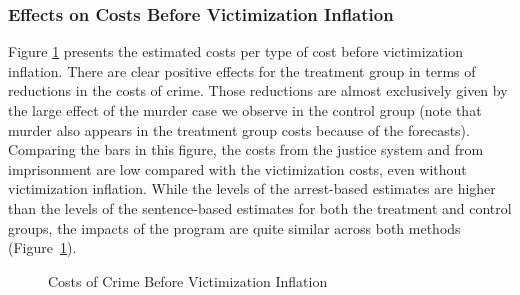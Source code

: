 \subsubsection{Effects on Costs Before Victimization Inflation}  Figure \ref{tab:diff-costs} presents the estimated costs per type of cost before victimization inflation.
\noindent There are clear positive effects for the treatment group in terms of reductions in the costs of crime. Those reductions are almost exclusively given by the large effect of the murder case we observe in the control group (note that murder also appears in the treatment group costs because of the forecasts). Comparing the bars in this figure, the costs from the justice system and from imprisonment are low compared with the victimization costs, even without victimization inflation. While the levels of the arrest-based estimates are higher than the levels of the sentence-based estimates for both the treatment and control groups, the impacts of the program are quite similar across both methods (Figure~\ref{tab:diff-costs}). 

\begin{figure} [H]
\caption{Costs of Crime Before Victimization Inflation}
\centering  \label{tab:diff-costs}
{}
\end{figure}

